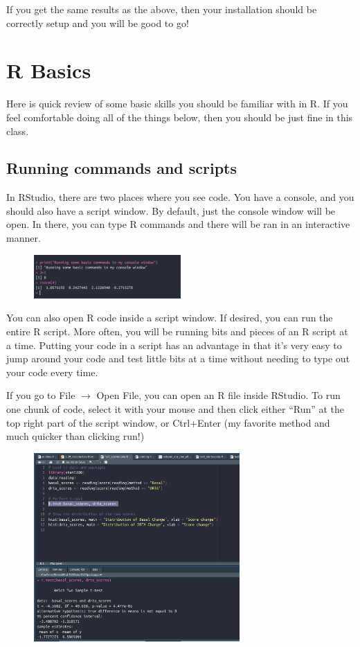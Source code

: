 \documentclass{article}\usepackage[]{graphicx}\usepackage[]{color}
\begin{document}
If you get the same results as the above, then your installation should be correctly setup and you will be good to go!

\section{R Basics}

Here is quick review of some basic skills you should be familiar with in R. If you feel comfortable doing all of the things below, then you should be just fine in this class.

\subsection{Running commands and scripts}

In RStudio, there are two places where you see code. You have a console, and you should also have a script window. By default, just the console window will be open. In there, you can type R commands and there will be ran in an interactive manner.

\begin{figure}[H]
  \centering
  \includegraphics[width = 0.50\textwidth]{../figures/module1/rconsole1.png}
\end{figure}

You can also open R code inside a script window. If desired, you can run the entire R script. More often, you will be running bits and pieces of an R script at a time. Putting your code in a script has an advantage in that it's very easy to jump around your code and test little bits at a time without needing to type out your code every time.

If you go to File $\rightarrow$ Open File, you can open an R file inside RStudio. To run one chunk of code, select it with your mouse and then click either ``Run'' at the top right part of the script window, or Ctrl+Enter (my favorite method and much quicker than clicking run!)

\begin{figure}[H]
  \centering
  \includegraphics[width = 0.70\textwidth]{../figures/module1/rscriptrun1.png}
\end{figure}
\end{document}
